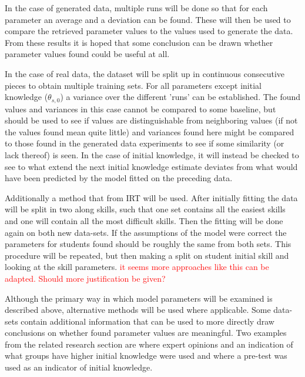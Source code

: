 \documentclass{scrartcl}
\newcommand\todo[1]{\textcolor{red}{#1}}
\begin{document}
In the case of generated data, multiple runs will be done so that for each parameter an average and a deviation can be found. These will then be used to compare the retrieved parameter values to the values used to generate the data. From these results it is hoped that some conclusion can be drawn whether parameter values found could be useful at all.
\begin{comment}
this probably needs to go. Not sure what I've been thinking here.
The models examined have some differences in what parameters are used exactly. In each models' paragraph it will therefore be described how the values (and variance) of its parameters can be compared to the values (and variance) of parameters of the models discussed before it.
\end{comment}
In the case of real data, the dataset will be split up in continuous consecutive pieces to obtain multiple training sets. For all parameters except initial knowledge ($\theta_{s,0}$) a variance over the different 'runs' can be established. The found values and variances in this case cannot be compared to some baseline, but should be used to see if values are distinguishable from neighboring values (if not the values found mean quite little) and variances found here might be compared to those found in the generated data experiments to see if some similarity (or lack thereof) is seen. In the case of initial knowledge, it will instead be checked to see to what extend the next initial knowledge estimate deviates from what would have been predicted by the model fitted on the preceding data.

Additionally a method that from IRT \cite{hambleton} will be used. After initially fitting the data will be split in two along skills, such that one set contains all the easiest skills and one will contain all the most difficult skills. Then the fitting will be done again on both new data-sets. If the assumptions of the model were correct the parameters for students found should be roughly the same from both sets. This procedure will be repeated, but then making a split on student initial skill and looking at the skill parameters. \todo{it seems more approaches like this can be adapted. Should more justification be given?}

Although the primary way in which model parameters will be examined is described above, alternative methods will be used where applicable. Some data-sets contain additional information that can be used to more directly draw conclusions on whether found parameter values are meaningful. Two examples from the related research section are \cite{eirt} where expert opinions and an indication of what groups have higher initial knowledge were used and \cite{ktpfa} where a pre-test was used as an indicator of initial knowledge.
\end{document}
